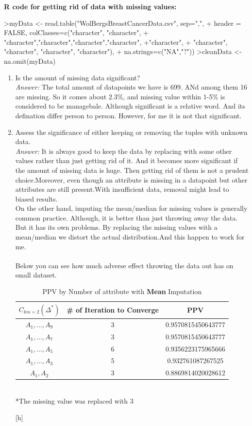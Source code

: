 \documentclass{article}
\begin{document}
\begin{enumerate}
\textbf{R code for getting rid of data with missing values:}
\begin{Sinput}
>myData <- read.table("WolBergsBreastCancerData.csv", sep=",", 
+ header = FALSE, colClasses=c("character", "character",
+ "character","character","character","character", +"character", 
+ "character", "character", "character", "character"), 
+ na.strings=c("NA","?"))
>cleanData <- na.omit(myData)
\end{Sinput}
	\begin{enumerate}
		\item Is the amount of missing data significant? \\
		\emph{Answer:} The total amount of datapoints we have is 699. ANd among them 16 are missing. So it comes about $2.3\%$, and missing value within 1-5\% is considered to be managebale.  Although significant is a relative word. And its defination differ person to person. However, for me it is not that significant. 
		\item Assess the significance of either keeping or removing the tuples with unknown data.\\
		\emph{Answer:} It is always good to keep the data by replacing with some other values rather than just getting rid of it. And it becomes more significant if the amount of missing data is huge. Then getting rid of them is not a prudent choice.Moreover, even though an attribute is missing in a datapoint but other attributes are still present.With insufficient data, removal might lead to biased results.\\
On the other hand, imputing the mean/median for missing values is generally common practice. Although, it is better than just throwing away the data. But it has its own problems. By replacing the missing values with a mean/median we distort the actual distribution.And this happen to work for me. \\
\\Below you can see how much adverse effect throwing the data out has on small dataset.

		\begin{table}[h]
			\caption{PPV by Number of attribute with \textbf{Mean} Imputation}

			\centering
			\begin{tabular}{c|c c}
				\\
				\hline
				$C_{km=2} (\Delta^*)$ & \# of Iteration to Converge & PPV \\
				\hline
				$A_1, . . . , A_9$ & 3 & 0.9570815450643777\\
				$A_1, . . . , A_7$ & 3 & 0.9570815450643777\\
				$A_1, . . . , A_5$ & 6 & 0.9356223175965666\\
				$A_1, . . . , A_3$ & 5 & 0.932761087267525\\
				$A_1, A_2$  & 3 & 0.8869814020028612\\
				\hline	
			\end{tabular} \\
			*The missing value was replaced with 3
		\end{table}[h] \\			
		

\end{enumerate}
\end{enumerate}
\end{document}
